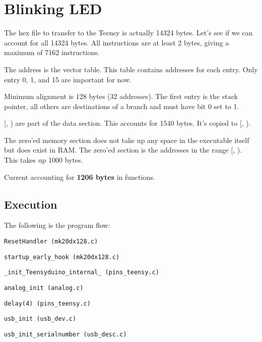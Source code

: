 \newpage
\section{Blinking LED}

The hex file to transfer to the Teensy is actually 14324 bytes.
Let's see if we can account for all 14324 bytes.
All instructions are at least 2 bytes, giving a maximum of 7162 instructions.

The address  is the vector table. This table contains
addresses for each entry. Only entry 0, 1, and 15 are important for now.

Minimum alignment is 128 bytes (32 addresses). The first entry is the stack
pointer, all others are destinations of a branch and must have bit 0 set to 1.

[, ) are part of the data
section. This accounts for 1540 bytes. It's copied to
[, ).

The zero'ed memory section does not take up any space in the executable itself
but does exist in RAM. The zero'ed section is the addresses in the range
[, ).
This takes up 1000 bytes.

Current accounting for \textbf{1206 bytes} in functions.

\subsection{Execution}

The following is the program flow:

\indent \texttt{ResetHandler (mk20dx128.c)}

\hspace{2mm} \texttt{startup\_early\_hook (mk20dx128.c)}

\hspace{2mm} \texttt{\_init\_Teensyduino\_internal\_ (pins\_teensy.c)}

\hspace{4mm} \texttt{analog\_init (analog.c)}

\hspace{4mm} \texttt{delay(4) (pins\_teensy.c)}

\hspace{4mm} \texttt{usb\_init (usb\_dev.c)}

\hspace{6mm} \texttt{usb\_init\_serialnumber (usb\_desc.c)}

